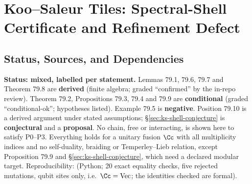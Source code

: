 
\section{Koo--Saleur Tiles: Spectral-Shell Certificate and Refinement Defect}
\label{sec:ks-shell-refinement-defect}

\subsection{Status, Sources, and Dependencies}

\textbf{Status: mixed, labelled per statement.}  Lemmas 79.1, 79.6, 79.7 and
Theorem 79.8 are \textbf{derived} (finite algebra; graded ``confirmed'' by the
in-repo review).  Theorem 79.2, Propositions 79.3, 79.4 and 79.9 are
\textbf{conditional} (graded ``conditional-ok''; hypotheses listed).  Example
79.5 is \textbf{negative}.  Position 79.10 is a derived argument under stated
assumptions; \S\ref{sec:ks-shell-conjecture} is \textbf{conjectural} and a
\textbf{proposal}.  No chain, free or interacting, is shown here to satisfy P0--P3.
Everything holds for a unitary fusion \(\Cc\) with all multiplicity indices and
no self-duality, braiding or Temperley--Lieb relation, except Proposition 79.9
and \S\ref{sec:ks-shell-conjecture}, which need a declared modular target.
Reproducibility: 
(Python; 20 exact equality checks, five rejected mutations, qubit sites only,
i.e.\ \(\Cc=\mathrm{Vec}\); the identities checked are formal).

